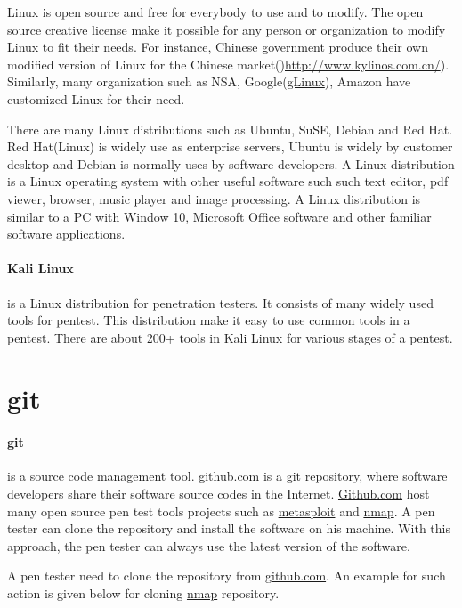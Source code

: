 \documentclass[7x9]{times}
\begin{document}
Linux is open source and free for everybody to use and to
modify. The open source creative license make it possible
for any person or organization to modify Linux to fit their
needs. For instance, Chinese government produce their own
modified version of Linux for the Chinese
market()\url{http://www.kylinos.com.cn/}). Similarly, many
organization such as NSA, Google(\url{gLinux}), Amazon have
customized Linux for their need.

There are many Linux distributions such as Ubuntu, SuSE,
Debian and Red Hat. Red Hat(Linux) is widely use as
enterprise servers, Ubuntu is widely by customer desktop and
Debian is normally uses by software developers. A Linux
distribution is a Linux operating system with other useful
software such such text editor, pdf viewer, browser, music
player and image processing. A Linux distribution is similar
to a PC with Window 10, Microsoft Office software and other
familiar software applications.



\paragraph{Kali Linux}is a Linux distribution for
penetration testers. It consists of many widely used tools
for pentest. This distribution make it easy to use common
tools in a pentest. There are about 200+ tools in Kali Linux
for various stages of a pentest.

\section{git}

\paragraph{git}\cite{loeliger2012} is a source code
management tool. \url{github.com} is a git repository, where
software developers share their software source codes in the
Internet. \url{Github.com} host many open source pen test
tools projects such as \url{metasploit} and \url{nmap}. A
pen tester can clone the repository and install the software
on his machine. With this approach, the pen tester can
always use the latest version of the software.

A pen tester need to clone the repository from
\url{github.com}. An example for such action is given below
for cloning \url{nmap} repository.
\end{document}
